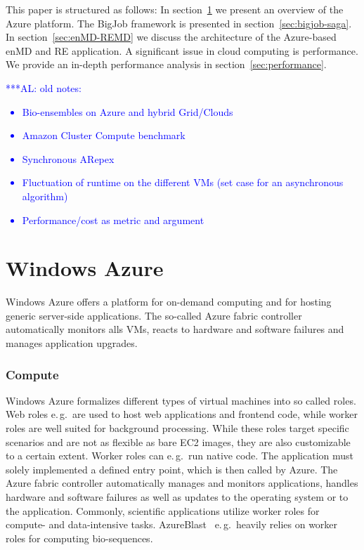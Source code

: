 \documentclass[conference,final]{IEEEtran}
\newcommand{\up}{\vspace*{-1em}}
\newcommand{\alnote}[1]{ {\textcolor{blue} { ***AL: #1 }}}
\newcommand{\jhanote}[1]{ {\textcolor{red} { ***SJ: #1 }}}
\newcommand{\alnote}[1]{}
\newcommand{\jhanote}[1]{}
\begin{document}
This paper is structured as follows: In section~\ref{sec:azure} we
present an overview of the Azure platform. The BigJob framework 
is presented in section~\ref{sec:bigjob-saga}. In section~\ref{sec:enMD-REMD} we
discuss the architecture of the Azure-based enMD and RE application.
A significant issue in cloud computing is performance. We provide an
in-depth performance analysis in section~\ref{sec:performance}.


\alnote{old notes:
\begin{itemize}
    \item Bio-ensembles on Azure and hybrid Grid/Clouds
    \item Amazon Cluster Compute benchmark
    \item Synchronous ARepex
    \item Fluctuation of runtime on the different VMs (set case for an
      asynchronous algorithm)
    \item Performance/cost as metric and argument
\end{itemize}}




\section{Windows Azure}
\label{sec:azure}
\up
Windows Azure offers a platform for on-demand computing and
for hosting generic server-side applications. The so-called Azure
fabric controller automatically monitors alls VMs, 
reacts to hardware and software failures and manages application
upgrades.

\subsubsection{Compute}

Windows Azure formalizes different types of virtual machines into
so called roles. Web roles e.\,g.\ are used to host web applications
and frontend code, while worker roles are well suited for background
processing. While these roles target specific scenarios and are not
as flexible as bare EC2 images, they are also customizable to
a certain extent. Worker roles can e.\,g.\ run native code. The
application must solely implemented a defined entry point, which is
then called by Azure. The Azure fabric controller automatically
manages and monitors applications, handles hardware and software
failures as well as updates to the operating system or to the
application.  Commonly, scientific applications utilize worker roles
for compute- and data-intensive tasks. AzureBlast~\cite{azure_blast}
e.\,g.\ heavily relies on worker roles for computing bio-sequences.
\end{document}
